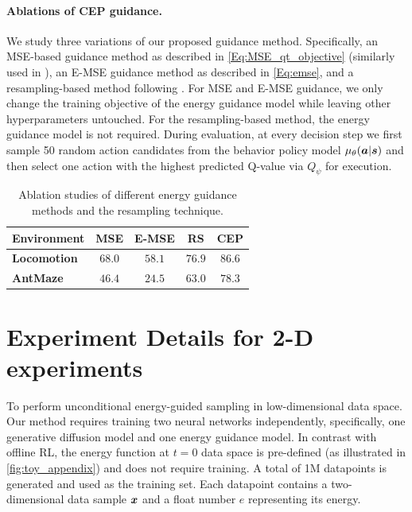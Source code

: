 \paragraph{Ablations of CEP guidance.}
We study three variations of our proposed guidance method. Specifically, an MSE-based guidance method as described in \eqref{Eq:MSE_qt_objective} (similarly used in \citet{diffuser}), an E-MSE guidance method as described in \eqref{Eq:emse}, and a resampling-based method following \citet{sfbc}. For MSE and E-MSE guidance, we only change the training objective of the energy guidance model while leaving other hyperparameters untouched. For the resampling-based method, the energy guidance model is not required. During evaluation, at every decision step we first sample 50 random action candidates from the behavior policy model $\mu_\theta({\bm{a}}|{\bm{s}})$ and then select one action with the highest predicted Q-value via $Q_\psi$ for execution.

\begin{table}[]
    \centering
    \begin{tabular}{lcccc}
        \toprule
        \textbf{Environment} & \textbf{MSE}& \textbf{E-MSE} & \textbf{RS} & \textbf{CEP} \\
        \midrule
        \textbf{Locomotion} & $68.0$  & $58.1$ & $76.9$  & $86.6$\\ 
        \textbf{AntMaze} & $46.4$ & $24.5$ & $63.0$ & $78.3$ \\ 
        \bottomrule
    \end{tabular}
    \caption{Ablation studies of different energy guidance methods and the resampling technique.}
    \label{tab:Ablation_RL}
\end{table}











\section{Experiment Details for 2-D experiments}
To perform unconditional energy-guided sampling in low-dimensional data space. Our method requires training two neural networks independently, specifically, one generative diffusion model and one energy guidance model. In contrast with offline RL, the energy function at $t=0$ data space is pre-defined (as illustrated in \cref{fig:toy_appendix}) and does not require training. A total of 1M datapoints is generated and used as the training set. Each datapoint contains a two-dimensional data sample ${\bm{x}}$ and a float number $e$ representing its energy.

